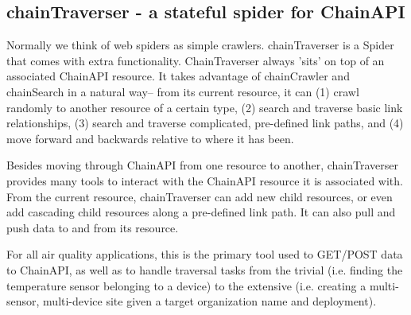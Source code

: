 \subsection{chainTraverser - a stateful spider for ChainAPI}

Normally we think of web spiders as simple crawlers.  chainTraverser is a Spider that comes with extra functionality.  ChainTraverser always 'sits' on top of an associated ChainAPI resource.  It takes advantage of chainCrawler and chainSearch in a natural way-- from its current resource, it can (1) crawl randomly to another resource of a certain type, (2) search and traverse basic link relationships, (3) search and traverse complicated, pre-defined link paths, and (4) move forward and backwards relative to where it has been. 

Besides moving through ChainAPI from one resource to another, chainTraverser provides many tools to interact with the ChainAPI resource it is associated with.  From the current resource, chainTraverser can add new child resources, or even add cascading child resources along a pre-defined link path.  It can also pull and push data to and from its resource.

For all air quality applications, this is the primary tool used to GET/POST data to ChainAPI, as well as to handle traversal tasks from the trivial (i.e. finding the temperature sensor belonging to a device) to the extensive (i.e. creating a multi-sensor, multi-device site given a target organization name and deployment).


